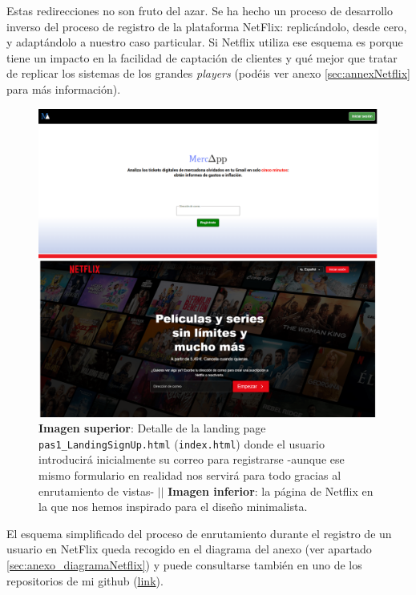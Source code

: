 \documentclass[a4paper,12pt]{report}
\begin{document}
	

	
	Estas redirecciones no son fruto del azar. Se ha hecho un proceso de desarrollo inverso del proceso de registro de la plataforma NetFlix: replicándolo, desde cero, y adaptándolo a nuestro caso particular. Si Netflix utiliza ese esquema es porque tiene un impacto en la facilidad de captación de clientes y qué mejor que tratar de replicar los sistemas de los grandes \textit{players} (podéis ver anexo \ref{sec:annexNetflix} para más información).
	
	
	
	\setlength{\belowcaptionskip}{3pt}
	\FloatBarrier
	\begin{figure}[H]
		\centering
		\caption{\textbf{Imagen superior}: Detalle de la landing page \texttt{pas1\_LandingSignUp.html} (\texttt{index.html}) donde el usuario introducirá inicialmente su correo para registrarse -aunque ese mismo formulario en realidad nos servirá para todo gracias al enrutamiento de vistas- $||$ \textbf{Imagen inferior}: la página de Netflix en la que nos hemos inspirado para el diseño minimalista.}
		\includegraphics[width=1\textwidth]{img/landingSignUp.png}

		\label{fig:landingSignUpDETALL} 
	\end{figure}
	\FloatBarrier
	
	El esquema simplificado del proceso de enrutamiento durante el registro de un usuario en NetFlix queda recogido en el diagrama del anexo (ver apartado \ref{sec:anexo_diagramaNetflix}) y puede consultarse también en uno de los repositorios de mi github (\href{https://www.github.com/miApp}{link}). 
	
\end{document}
